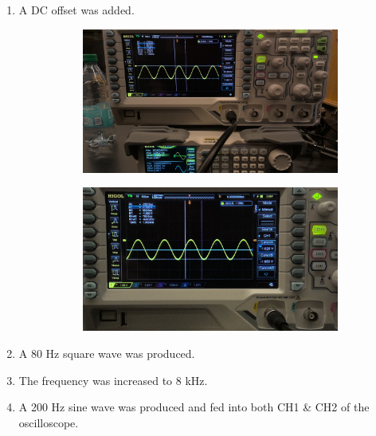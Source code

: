 \documentclass{article}
\begin{document}
\begin{enumerate}[label=(\alph*)]
                \item A DC offset was added.
                \begin{figure}[h]
                    \centering
                    \begin{subfigure}{0.4\textwidth}
                        \includegraphics[width=\linewidth]{d v.jpg}
                    \end{subfigure}
                    \begin{subfigure}{0.4\textwidth}
                        \includegraphics[width=\linewidth]{d offset.jpg}
                    \end{subfigure}
                \end{figure}
                \item A 80 Hz square wave was produced.
                \item The frequency was increased to 8 kHz.
                \item A 200 Hz sine wave was produced and fed into both CH1 \& CH2 of the oscilloscope.
            \end{enumerate}
\end{document}
